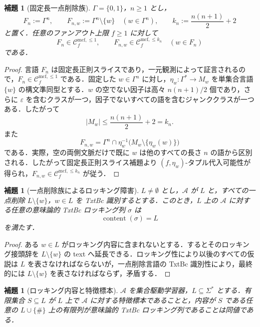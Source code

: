 \documentclass[11pt,a4paper]{ltjsarticle}
\numberwithin{equation}{section}
\theoremstyle{plain}
\newtheorem{lemma}[theorem]{補題}
\theoremstyle{definition}
\theoremstyle{remark}
\newcommand{\Clatent}[2]{\mathcal{C}^{\mathrm{mcf},\le #2}_{#1}}
\newcommand{\eps}{\varepsilon}
\begin{document}
\begin{lemma}[固定長一点削除族]
\label{lem:fixed-length-deletion-family}
\(\Gamma=\{0,1\}\)，\(n\ge1\) とし，
\[
  F_n:=\Gamma^n,\qquad
  F_{n,w}:=\Gamma^n\setminus\{w\}\quad(w\in\Gamma^n),
  \qquad
  k_n:=\frac{n(n+1)}2+2
\]
と置く．任意のファンアウト上限 \(f\ge1\) に対して
\[
  F_n\in\Clatent{f}{1},
  \qquad
  F_{n,w}\in\Clatent{f}{k_n}
  \quad(w\in F_n)
\]
である．
\end{lemma}

\begin{proof}
言語 \(F_n\) は固定長正則スライスであり，一元観測によって証言されるので，\(F_n\in\Clatent{f}{1}\) である．固定した \(w\in\Gamma^n\) に対し，\(\eta_w:\Gamma^*\to M_w\) を単集合言語 \(\{w\}\) の構文準同型とする．\(w\) の空でない因子は高々 \(n(n+1)/2\) 個であり，さらに \(\eps\) を含むクラスが一つ，因子でないすべての語を含むジャンククラスが一つある．したがって
\[
  |M_w|\le \frac{n(n+1)}2+2=k_n.
\]
また
\[
  F_{n,w}=\Gamma^n\cap
  \eta_w^{-1}\bigl(M_w\setminus\{\eta_w(w)\}\bigr)
\]
である．実際，空の両側文脈だけで既に \(w\) は他のすべての長さ \(n\) の語から区別される．したがって固定長正則スライス補題より \((f,\eta_w)\)-タプル代入可能性が得られ，\(F_{n,w}\in\Clatent{f}{k_n}\) が従う．
\end{proof}

\begin{lemma}[一点削除族によるロッキング障害]
\label{lem:deletion-locking-obstruction}
\(L\ne\emptyset\) とし，\(\mathcal A\) が \(L\) と，すべての一点削除 \(L\setminus\{w\}\)，\(w\in L\) を TxtBc 識別するとする．このとき，\(L\) 上の \(\mathcal A\) に対する任意の意味論的 TxtBc ロッキング列 \(\sigma\) は
\[
  \operatorname{content}(\sigma)=L
\]
を満たす．
\end{lemma}

\begin{proof}
ある \(w\in L\) がロッキング内容に含まれないとする．するとそのロッキング接頭辞を \(L\setminus\{w\}\) の text へ延長できる．ロッキング性により以後のすべての仮説は \(L\) を表さなければならないが，一点削除言語の TxtBc 識別性により，最終的には \(L\setminus\{w\}\) を表さなければならず，矛盾する．
\end{proof}

\begin{lemma}[ロッキング内容と特徴標本]
\label{lem:locking-characteristic-bridge}
\(\mathcal A\) を集合駆動学習器，\(L\subseteq\Sigma^*\) とする．有限集合 \(S\subseteq L\) が \(L\) 上で \(\mathcal A\) に対する特徴標本であることと，内容が \(S\) である任意の \(L\cup\{\#\}\) 上の有限列が意味論的 TxtBc ロッキング列であることは同値である．
\end{lemma}
\end{document}
